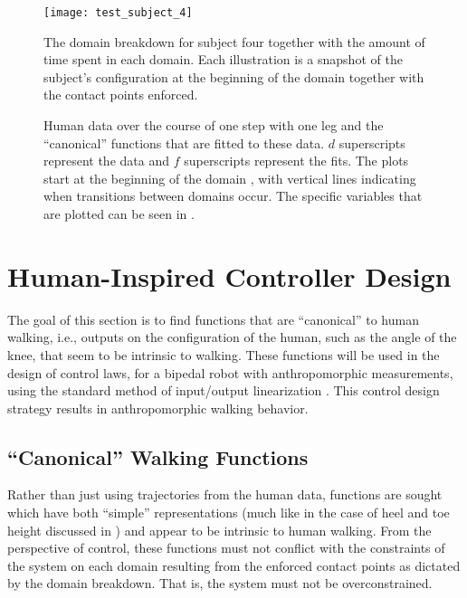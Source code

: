 \begin{figure}[t]
  \centering
  \texttt{[image: test\_subject\_4]}
  \caption{The domain breakdown for subject four together with the amount of time spent in each domain. Each illustration is a snapshot of the subject's configuration at the beginning of the domain together with the contact points enforced.}
  \label{fred}
\end{figure}

\begin{figure}[t!]
  \centering
  \caption{Human data over the course of one step with one leg and the ``canonical'' functions that are fitted to these data. $d$ superscripts represent the data and $f$ superscripts represent the fits. The plots start at the beginning of the domain {\DA}, with vertical lines indicating when transitions between domains occur. The specific variables that are plotted can be seen in .}
  \label{fig:constraints-fitting}
\end{figure}

\section{Human-Inspired Controller Design} \noindent
The goal of this section is to find functions that are ``canonical'' to human
walking, i.e., outputs on the configuration of the human, such as the angle of
the knee, that seem to be intrinsic to walking. These functions will be used in
the design of control laws, for a bipedal robot with anthropomorphic
measurements, using the standard method of input/output linearization
\cite{Sastry1999}. This control design strategy results in anthropomorphic
walking behavior.

\subsection{``Canonical'' Walking Functions} \label{sec:functions} \noindent
Rather than just using trajectories from the human data, functions are sought which have both ``simple'' representations (much like in the case of heel and toe height discussed in ) and appear to be intrinsic to human walking. From the perspective of control, these functions must not conflict with the constraints of the system on each domain resulting from the enforced contact points as dictated by the domain breakdown. That is, the system must not be overconstrained.

